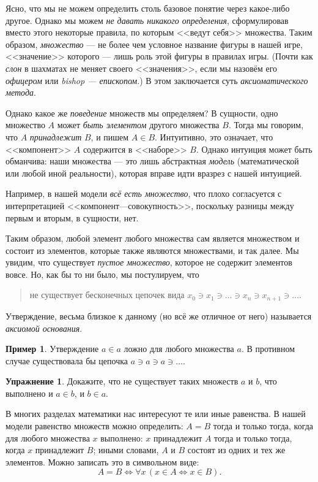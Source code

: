 \documentclass[12pt,notitlepage]{article}
\theoremstyle{plain}
\theoremstyle{definition}
\newtheorem{exc}[thm]{Упражнение}
\newtheorem{exm}[thm]{Пример}
\theoremstyle{plain}
\newcommand{\1}{\mathbf{1}}
\newcommand{\0}{\mathbf{0}}
\newcommand{\mcomm}[1]{}
\begin{document}
Ясно, что мы не можем определить столь базовое понятие через какое-либо другое. Однако мы можем \emph{не давать никакого определения}, сформулировав вместо этого некоторые правила, по которым <<ведут себя>> множества. Таким образом, \emph{множество} --- не более чем условное название фигуры в нашей игре, <<значение>> которого --- лишь роль этой фигуры в правилах игры. (Почти как \emph{слон} в шахматах не меняет своего <<значения>>, если мы назовём его \emph{офицером} или \emph{bishop --- епископом}.) В этом заключается суть \emph{аксиоматического метода}.

Однако какое же \emph{поведение} множеств мы определяем? В сущности, одно множество $A$ может \emph{быть элементом} другого множества $B$. Тогда мы говорим, что $A$ \emph{принадлежит} $B$, и пишем $A \in B$. Интуитивно, это означает, что <<компонент>> $A$ содержится в <<наборе>> $B$. Однако интуиция может быть обманчива: наши множества --- это лишь абстрактная \emph{модель} (математической или любой иной реальности), которая вправе идти вразрез с нашей интуицией.

Например, в нашей модели \emph{всё есть множество}, что плохо согласуется с интерпретацией <<компонент---совокупность>>, поскольку разницы между первым и вторым, в сущности, нет.

Таким образом, любой элемент любого множества сам является множеством и состоит из элементов, которые также являются множествами, и так далее. Мы увидим, что существует \emph{пустое множество}, которое не содержит элементов вовсе. Но, как бы то ни было, мы постулируем, что
\begin{quote}
	не существует бесконечных цепочек вида $x_0 \ni x_1 \ni \ldots \ni x_n \ni x_{n+1} \ni \ldots$.
\end{quote}
Утверждение, весьма близкое к данному (но всё же отличное от него) называется \emph{аксиомой основания}.

\mcomm{Clearly, the standard Axiom of Foundation implies this one. For the other direction, they usually apply the Axiom of (Dependent) Choice.}
\begin{exm}
	Утверждение $a \in a$ ложно для любого множества $a$. В противном случае существовала бы цепочка $a \ni a \ni a \ni\ldots$.
\end{exm}
\begin{exc}
	Докажите, что не существует таких множеств $a$ и $b$, что выполнено и $a \in b$, и $b \in a$.
\end{exc}

В многих разделах математики нас интересуют те или иные равенства. В нашей модели равенство множеств можно определить: $A = B$ тогда и только тогда, когда для любого множества $x$ выполнено: $x$ принадлежит $A$ тогда и только тогда, когда $x$ принадлежит $B$; иными словами, $A$ и $B$ состоят из одних и тех же элементов. Можно записать это в символьном виде:
$$A = B \iff \forall x\, (x \in A \iff x \in B).$$
\end{document}
